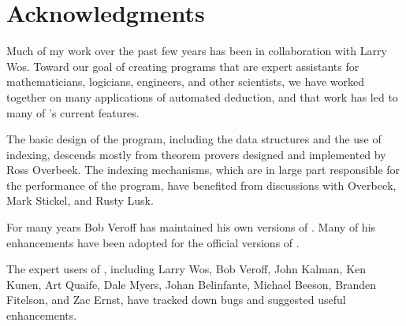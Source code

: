 \documentclass[11pt]{article}
\begin{document}
\section*{Acknowledgments}

Much of my work over the
past few years has been in collaboration with Larry Wos.  Toward our
goal of creating programs that are expert assistants for
mathematicians, logicians, engineers, and other scientists, we have worked
together on many applications of automated deduction, and that work
has led to many of \otter's current features.

The basic design of the program, including the data structures and the
use of indexing, descends mostly from theorem provers designed and
implemented by Ross Overbeek.
The indexing mechanisms, which are in large part responsible for the
performance of the program, have benefited from discussions with
Overbeek, Mark Stickel, and Rusty Lusk.

For many years Bob Veroff has maintained his own versions of \otter.
Many of his enhancements have been adopted for the official versions
of \otter.

The expert users of \otter, including
Larry Wos,
Bob Veroff,
John Kalman,
Ken Kunen,
Art Quaife,
Dale Myers,
Johan Belinfante,
Michael Beeson,
Branden Fitelson, and
Zac Ernst,
have tracked down bugs and suggested useful enhancements.



% 
\end{document}
